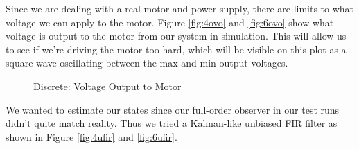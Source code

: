 \documentclass{article}
\begin{document}
Since we are dealing with a real motor and power supply, there are limits to what voltage we can apply to the motor. Figure \ref{fig:4ovo} and \ref{fig:6ovo} show what voltage is output to the motor from our system in simulation. This will allow us to see if we're driving the motor too hard, which will be visible on this plot as a square wave oscillating between the max and min output voltages.

\begin{figure}
\centering
{}
\caption{Discrete: Voltage Output to Motor}
\end{figure}

We wanted to estimate our states since our full-order observer in our test runs didn't quite match reality. Thus we tried a Kalman-like unbiased FIR filter as shown in Figure 	\ref{fig:4ufir} and \ref{fig:6ufir}.
\end{document}
